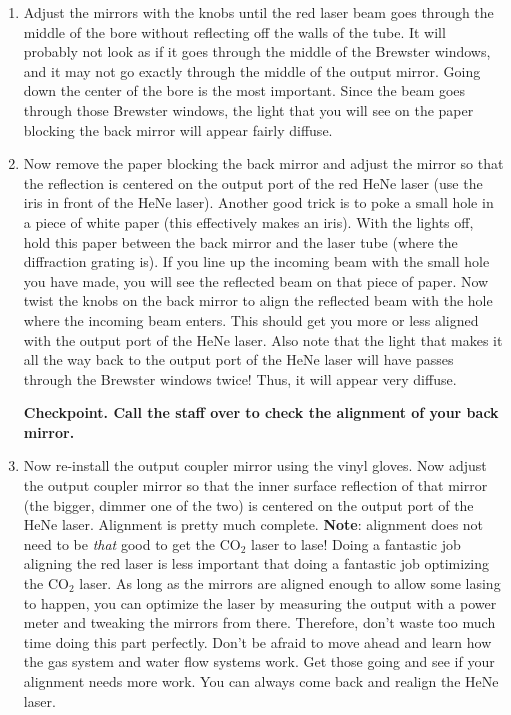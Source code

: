 \documentclass{../lab}
\begin{document}
\begin{enumerate}
\newpage

    \item Adjust the mirrors with the knobs until the red laser beam goes through the middle of the bore without reflecting off the walls of the tube. It will probably not look as if it goes through the middle of the Brewster windows, and it may not go exactly through the middle of the output mirror. Going down the center of the bore is the most important. Since the beam goes through those Brewster windows, the light that you will see on the paper blocking the back mirror will appear fairly diffuse.

    \item Now remove the paper blocking the back mirror and adjust the mirror so that the reflection is centered on the output port of the red HeNe laser (use the iris in front of the HeNe laser). Another good trick is to poke a small hole in a piece of white paper (this effectively makes an iris). With the lights off, hold this paper between the back mirror and the laser tube (where the diffraction grating is). If you line up the incoming beam with the small hole you have made, you will see the reflected beam on that piece of paper. Now twist the knobs on the back mirror to align the reflected beam with the hole where the incoming beam enters. This should get you more or less aligned with the output port of the HeNe laser. Also note that the light that makes it all the way back to the output port of the HeNe laser will have passes through the Brewster windows twice! Thus, it will appear very diffuse.
    
    \textbf{Checkpoint. Call the staff over to check the alignment of your back mirror.}

    \item Now re-install the output coupler mirror using the vinyl gloves. Now adjust the output coupler mirror so that the inner surface reflection of that mirror (the bigger, dimmer one of the two) is centered on the output port of the HeNe laser. Alignment is pretty much complete. \textbf{Note}: alignment does not need to be \emph{that} good to get the CO$_2$ laser to lase! Doing a fantastic job aligning the red laser is less important that doing a fantastic job optimizing the CO$_2$ laser. As long as the mirrors are aligned enough to allow some lasing to happen, you can optimize the laser by measuring the output with a power meter and tweaking the mirrors from there. Therefore, don't waste too much time doing this part perfectly. Don't be afraid to move ahead and learn how the gas system and water flow systems work. Get those going and see if your alignment needs more work. You can always come back and realign the HeNe laser.


\end{enumerate}
\end{document}
